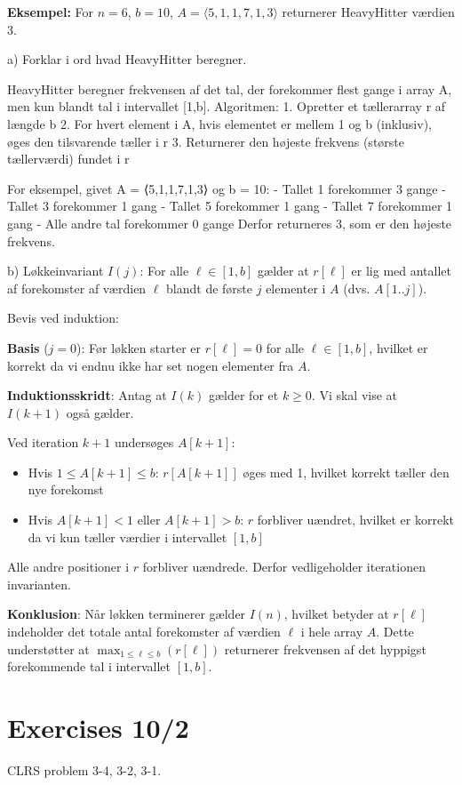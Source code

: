 \documentclass{article}
\theoremstyle{definition}
\begin{document}
\textbf{Eksempel:} For $n = 6$, $b = 10$, $A = \langle 5,1,1,7,1,3 \rangle$ returnerer HeavyHitter værdien 3.

a) Forklar i ord hvad HeavyHitter beregner. 

HeavyHitter beregner frekvensen af det tal, der forekommer flest gange i array A, men kun blandt tal i intervallet [1,b]. Algoritmen:
1. Opretter et tællerarray r af længde b
2. For hvert element i A, hvis elementet er mellem 1 og b (inklusiv), øges den tilsvarende tæller i r
3. Returnerer den højeste frekvens (største tællerværdi) fundet i r

For eksempel, givet A = ⟨5,1,1,7,1,3⟩ og b = 10:
- Tallet 1 forekommer 3 gange
- Tallet 3 forekommer 1 gang
- Tallet 5 forekommer 1 gang
- Tallet 7 forekommer 1 gang
- Alle andre tal forekommer 0 gange
Derfor returneres 3, som er den højeste frekvens.

b) Løkkeinvariant $I(j)$: For alle $\ell \in [1,b]$ gælder at $r[\ell]$ er lig med antallet af forekomster af værdien $\ell$ blandt de første $j$ elementer i $A$ (dvs. $A[1..j]$).

Bevis ved induktion:

\textbf{Basis} ($j = 0$):
Før løkken starter er $r[\ell] = 0$ for alle $\ell \in [1,b]$, hvilket er korrekt da vi endnu ikke har set nogen elementer fra $A$.

\textbf{Induktionsskridt}:
Antag at $I(k)$ gælder for et $k \geq 0$. Vi skal vise at $I(k+1)$ også gælder.

Ved iteration $k+1$ undersøges $A[k+1]$:
\begin{itemize}
    \item Hvis $1 \leq A[k+1] \leq b$: $r[A[k+1]]$ øges med 1, hvilket korrekt tæller den nye forekomst
    \item Hvis $A[k+1] < 1$ eller $A[k+1] > b$: $r$ forbliver uændret, hvilket er korrekt da vi kun tæller værdier i intervallet $[1,b]$
\end{itemize}

Alle andre positioner i $r$ forbliver uændrede. Derfor vedligeholder iterationen invarianten.

\textbf{Konklusion}:
Når løkken terminerer gælder $I(n)$, hvilket betyder at $r[\ell]$ indeholder det totale antal forekomster af værdien $\ell$ i hele array $A$. Dette understøtter at $\max_{1 \leq \ell \leq b}(r[\ell])$ returnerer frekvensen af det hyppigst forekommende tal i intervallet $[1,b]$.


\section{Exercises 10/2}
CLRS problem 3-4, 3-2, 3-1. 
\end{document}
